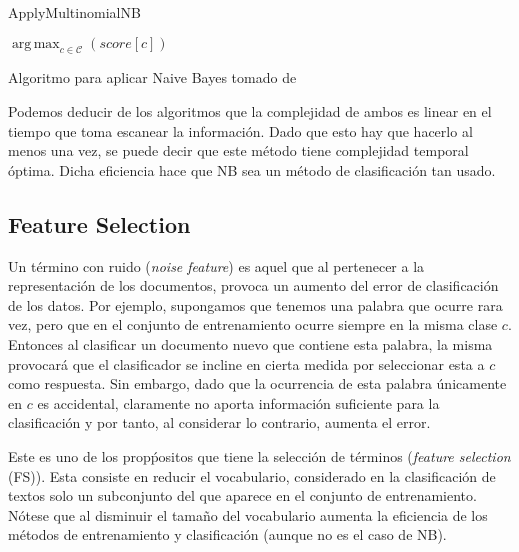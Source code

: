 \documentclass{llncs}
\DeclareMathOperator*{\argmax}{arg\,max}
\begin{document}
		 \begin{algorithm}\label{Alg2}
		 	\caption{ApplyMultinomialNB}
		 	\begin{algorithmic}[1]
		 		
		 		\EndFor
		 		\EndFor
		 		\State \textbf{\Return} $\argmax_{c\in \mathcal{C}}(score[c])$
		 	\end{algorithmic}
		 	
		 	\smallskip
		 	\tiny{Algoritmo para aplicar Naive Bayes tomado de \cite[Figura 13.2]{B1}}
		 \end{algorithm}
		 
		Podemos deducir de los algoritmos que la complejidad de ambos es linear en el tiempo que toma escanear la informaci\'on. Dado que esto hay que hacerlo al menos una vez, se puede decir que este m\'etodo tiene complejidad temporal \'optima. Dicha eficiencia hace que NB sea un m\'etodo de clasificaci\'on tan usado.
	
	
	\subsection{Feature Selection}
		Un t\'ermino con ruido (\emph{noise feature}) es aquel que al pertenecer a la representaci\'on de los documentos, provoca un aumento del error de clasificaci\'on de los datos. Por ejemplo, supongamos que tenemos una palabra que ocurre rara vez, pero que en el conjunto de entrenamiento ocurre siempre en la misma clase $c$. Entonces al clasificar un documento nuevo que contiene esta palabra, la misma provocar\'a que el clasificador se incline en cierta medida por seleccionar esta a $c$ como respuesta. Sin embargo, dado que la ocurrencia de esta palabra \'unicamente en $c$ es accidental, claramente no aporta informaci\'on suficiente para la clasificaci\'on y por tanto, al considerar lo contrario, aumenta el error.
		
		Este es uno de los prop\'positos que tiene la selecci\'on de t\'erminos (\emph{feature selection} (FS)). Esta consiste en reducir el vocabulario, considerado en la clasificaci\'on de textos solo un subconjunto del que aparece en el conjunto de entrenamiento. N\'otese que al disminuir el tama\~no del vocabulario aumenta la eficiencia de los m\'etodos de entrenamiento y clasificaci\'on (aunque no es el caso de NB).
		
\end{document}

